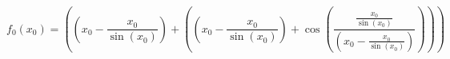 \documentclass{article}
\begin{document}
\begin{equation}
f_0(x_0)=\left(\left(x_0 - \frac{x_0}{\sin(x_0 )}\right) + \left(\left(x_0 - \frac{x_0}{\sin(x_0 )}\right) +  \cos(\frac{\frac{x_0}{\sin(x_0 )}}{\left(x_0 - \frac{x_0}{\sin(x_0 )}\right)} )\right)\right)
\end{equation}
\end{document}
